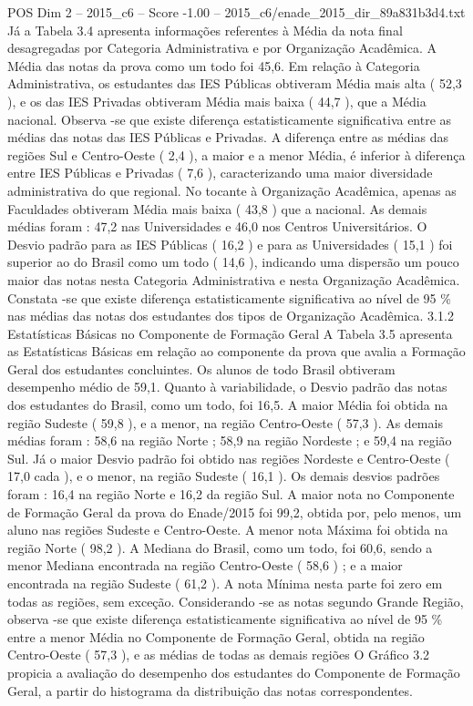 \begin{textsample}{POS Dim 2 – 2015\_c6 – Score -1.00 – 2015\_c6/enade\_2015\_dir\_89a831b3d4.txt}
Já a Tabela 3.4 apresenta informações referentes à Média da nota final desagregadas por Categoria Administrativa e por Organização Acadêmica.
A Média das notas da prova como um todo foi 45,6.
Em relação à Categoria Administrativa, os estudantes das IES Públicas obtiveram Média mais alta ( 52,3 ), e os das IES Privadas obtiveram Média mais baixa ( 44,7 ), que a Média nacional.
Observa -se que existe diferença estatisticamente significativa entre as médias das notas das IES Públicas e Privadas.
A diferença entre as médias das regiões Sul e Centro-Oeste ( 2,4 ), a maior e a menor Média, é inferior à diferença entre IES Públicas e Privadas ( 7,6 ), caracterizando uma maior diversidade administrativa do que regional.
No tocante à Organização Acadêmica, apenas as Faculdades obtiveram Média mais baixa ( 43,8 ) que a nacional.
As demais médias foram : 47,2 nas Universidades e 46,0 nos Centros Universitários.
O Desvio padrão para as IES Públicas ( 16,2 ) e para as Universidades ( 15,1 ) foi superior ao do Brasil como um todo ( 14,6 ), indicando uma dispersão um pouco maior das notas nesta Categoria Administrativa e nesta Organização Acadêmica.
Constata -se que existe diferença estatisticamente significativa ao nível de 95 \% nas médias das notas dos estudantes dos tipos de Organização Acadêmica. 3.1.2 Estatísticas Básicas no Componente de Formação Geral A Tabela 3.5 apresenta as Estatísticas Básicas em relação ao componente da prova que avalia a Formação Geral dos estudantes concluintes.
Os alunos de todo Brasil obtiveram desempenho médio de 59,1.
Quanto à variabilidade, o Desvio padrão das notas dos estudantes do Brasil, como um todo, foi 16,5.
A maior Média foi obtida na região Sudeste ( 59,8 ), e a menor, na região Centro-Oeste ( 57,3 ).
As demais médias foram : 58,6 na região Norte ; 58,9 na região Nordeste ; e 59,4 na região Sul.
Já o maior Desvio padrão foi obtido nas regiões Nordeste e Centro-Oeste ( 17,0 cada ), e o menor, na região Sudeste ( 16,1 ).
Os demais desvios padrões foram : 16,4 na região Norte e 16,2 da região Sul.
A maior nota no Componente de Formação Geral da prova do Enade/2015 foi 99,2, obtida por, pelo menos, um aluno nas regiões Sudeste e Centro-Oeste.
A menor nota Máxima foi obtida na região Norte ( 98,2 ).
A Mediana do Brasil, como um todo, foi 60,6, sendo a menor Mediana encontrada na região Centro-Oeste ( 58,6 ) ; e a maior encontrada na região Sudeste ( 61,2 ).
A nota Mínima nesta parte foi zero em todas as regiões, sem exceção.
Considerando -se as notas segundo Grande Região, observa -se que existe diferença estatisticamente significativa ao nível de 95 \% entre a menor Média no Componente de Formação Geral, obtida na região Centro-Oeste ( 57,3 ), e as médias de todas as demais regiões O Gráfico 3.2 propicia a avaliação do desempenho dos estudantes do Componente de Formação Geral, a partir do histograma da distribuição das notas correspondentes.

\end{textsample}
